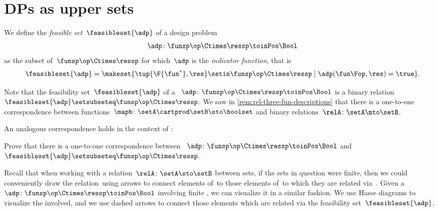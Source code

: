 \section{DPs as upper sets}

\begin{definition}
    \label{def:dp-feasible-set}
    We define the \emph{feasible set}~$\feasibleset{\adp}$ of a design problem
    \begin{equation}
        \label{eq:generic-design-prob}
        \adp\colon \funsp\op \Ctimes \ressp \toinPos \Bool
    \end{equation}
    as the subset of~$\funsp \op\Ctimes \ressp$ for which~$\adp$ is the \emph{indicator function}, that is%
    \begin{equation}
        \label{eq:design-prob-as-upper-set}
        \feasibleset{\adp} = \makeset{ \tup{\F{\fun^*},\res} \setin \funsp \op\Ctimes \ressp  \mid %
            \adp(\fun\Fop, \res) = \true %
        }.
    \end{equation}
\end{definition}

Note that the feasibility set~$\feasibleset{\adp}$ of a ~$\adp \colon \funsp \op \Ctimes \ressp\toinPos \Bool$ is a binary relation~$\feasibleset{\adp} \setsubseteq \funsp\op \Ctimes \ressp$.
We saw in \cref{rem:rel-three-fun-descriptions} that there is a one-to-one correspondence between functions~$\mapb \colon \setA \cartprod \setB \sto \boolset$ and binary relations~$\relA\colon \setA \mto \setB$.

An analogous correspondence holds in the context of :

\begin{exercise}
    \label{ex:adp-uppersets}
    Prove that there is a one-to-one correspondence between ~$\adp \colon \funsp \op \Ctimes \ressp\toinPos \Bool$ and ~$\feasibleset{\adp} \setsubseteq \funsp\op \Ctimes \ressp$.
\end{exercise}
\begin{solution}
    \missingsolution

\end{solution}

Recall that when working with a relation~$\relA \colon \setA \sto \setB$ between sets, if the sets in question were finite, then we could conveniently draw the relation~\relA using arrows to connect elements of~\setA to those elements of~\setB to which they are related via~\relA.
Given a ~$\adp \colon \funsp \op \Ctimes \ressp\toinPos \Bool$ involving finite , we can visualize it in a similar fashion.
We use Hasse diagrams to visualize the  involved, and we use dashed arrows to connect those elements which are related via the feasibility set~$\feasibleset{\adp}$.

